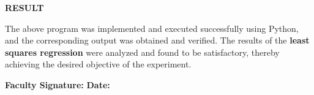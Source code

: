 \documentclass[11pt,twoside]{article}
\newcommand{\expheading}[1]{{\fontsize{14}{17}\selectfont\textbf{#1}\par}}
\newcommand{\tooddpage}{\clearpage\ifodd\value{page}\else\null\thispagestyle{empty}\newpage\fi}
\begin{document}
\tooddpage
\expheading{RESULT}
\vspace{4pt}
{\fontsize{12}{15}\selectfont
The above program was implemented and executed successfully using Python, and the corresponding output was obtained and verified. The results of the \textbf{least squares regression} were analyzed and found to be satisfactory, thereby achieving the desired objective of the experiment.\par
}

\vspace{12pt}

\noindent\textbf{Faculty Signature:} \underline{\hspace{3.6cm}} \hfill \textbf{Date:} \underline{\hspace{2.8cm}}\par

\tooddpage
\end{document}
